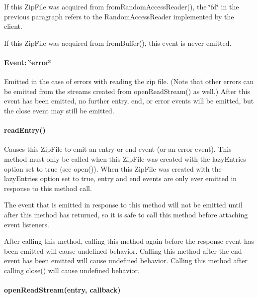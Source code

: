 If this {\ttfamily Zip\+File} was acquired from {\ttfamily from\+Random\+Access\+Reader()}, the \char`\"{}fd\char`\"{} in the previous paragraph refers to the {\ttfamily Random\+Access\+Reader} implemented by the client.

If this {\ttfamily Zip\+File} was acquired from {\ttfamily from\+Buffer()}, this event is never emitted.

\paragraph*{Event\+: \char`\"{}error\char`\"{}}

Emitted in the case of errors with reading the zip file. (Note that other errors can be emitted from the streams created from {\ttfamily open\+Read\+Stream()} as well.) After this event has been emitted, no further {\ttfamily entry}, {\ttfamily end}, or {\ttfamily error} events will be emitted, but the {\ttfamily close} event may still be emitted.

\paragraph*{read\+Entry()}

Causes this {\ttfamily Zip\+File} to emit an {\ttfamily entry} or {\ttfamily end} event (or an {\ttfamily error} event). This method must only be called when this {\ttfamily Zip\+File} was created with the {\ttfamily lazy\+Entries} option set to {\ttfamily true} (see {\ttfamily open()}). When this {\ttfamily Zip\+File} was created with the {\ttfamily lazy\+Entries} option set to {\ttfamily true}, {\ttfamily entry} and {\ttfamily end} events are only ever emitted in response to this method call.

The event that is emitted in response to this method will not be emitted until after this method has returned, so it is safe to call this method before attaching event listeners.

After calling this method, calling this method again before the response event has been emitted will cause undefined behavior. Calling this method after the {\ttfamily end} event has been emitted will cause undefined behavior. Calling this method after calling {\ttfamily close()} will cause undefined behavior.

\paragraph*{open\+Read\+Stream(entry, callback)}

